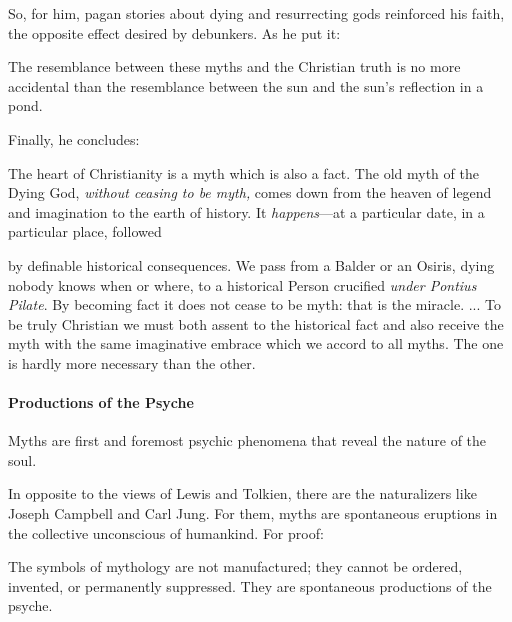So, for him, pagan stories about dying and resurrecting gods reinforced his faith, the opposite effect desired by debunkers. As he put it:

\begin{quotex}
The resemblance between these myths and the Christian truth is no more accidental than the resemblance between the sun and the sun's reflection in a pond.
\end{quotex}


Finally, he concludes:

\begin{quotex}
The heart of Christianity is a myth which is also a fact. The old myth of the Dying God, \emph{without ceasing to be myth,} comes down from the heaven of legend and imagination to the earth of history. It
\emph{happens}---at a particular date, in a particular place, followed

by definable historical consequences. We pass from a Balder or an Osiris, dying nobody knows when or where, to a historical Person crucified \emph{under Pontius Pilate}. By becoming fact it does not cease to be myth: that is the miracle. ... To be truly Christian we must both assent to the historical fact and also receive the myth with the same imaginative embrace which we accord to all myths. The one is hardly more necessary than the other.
\end{quotex}


\paragraph{Productions of the Psyche}


\begin{quotex}
Myths are first and foremost psychic phenomena that reveal the nature of the soul.
\end{quotex}


In opposite to the views of Lewis and Tolkien, there are the naturalizers like Joseph Campbell and Carl Jung. For them, myths are spontaneous eruptions in the collective unconscious of humankind. For proof:

\begin{quotex}
The symbols of mythology are not manufactured; they cannot be ordered, invented, or permanently suppressed. They are spontaneous productions of the psyche.
\end{quotex}


